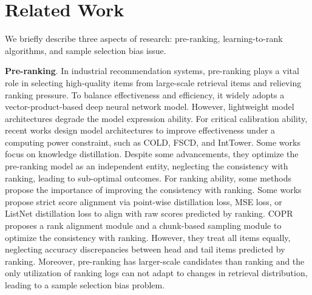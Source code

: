 \section{Related Work}
We briefly describe three aspects of research: pre-ranking, learning-to-rank algorithms, and sample selection bias issue.

\textbf{Pre-ranking}.
In industrial recommendation systems, pre-ranking plays a vital role in selecting high-quality items from large-scale retrieval items and relieving ranking pressure.
To balance effectiveness and efficiency, it widely adopts a vector-product-based deep neural network model\cite{2013dssm,2015lstmdssm}.
However, lightweight model architectures degrade the model expression ability. 
For critical calibration ability, recent works design model architectures to improve effectiveness under a computing power constraint, such as COLD\cite{2020cold}, FSCD\cite{2021fscd}, and IntTower\cite{2022inttower}.
Some works\cite{2020privileged,2020Meta-KD} focus on knowledge distillation. 
Despite some advancements, they optimize the pre-ranking model as an independent entity, neglecting the consistency with ranking, leading to sub-optimal outcomes.
For ranking ability, some  methods\cite{2022rankingConsistency,2023jdRethink} propose the importance of improving the consistency with ranking.
Some works propose strict score alignment via point-wise distillation loss\cite{2018_rank_distillation,2023rethinking}, MSE loss\cite{2022rankflow}, or ListNet distillation loss\cite{2023_list_distillation} to align with raw scores predicted by ranking. 
COPR\cite{2023_copr_ndcg} proposes a rank alignment module and a chunk-based sampling module to optimize the consistency with ranking. 
However, they treat all items equally, neglecting accuracy discrepancies between head and tail items predicted by ranking.
Moreover, pre-ranking has larger-scale candidates than ranking and the only utilization of ranking logs can not adapt to changes in retrieval distribution, leading to a sample selection bias problem.

